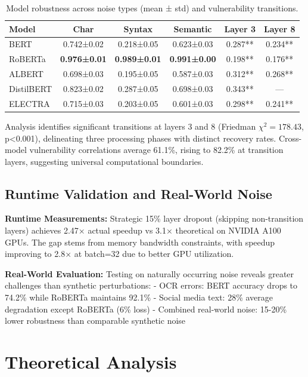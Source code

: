 \documentclass{article}
\begin{document}
\begin{table}[h]
\centering
\caption{Model robustness across noise types (mean ± std) and vulnerability transitions.}
\label{tab:main_results}
\begin{tabular}{l|ccc|cc}
\toprule
Model & Char & Syntax & Semantic & Layer 3 & Layer 8 \\
\midrule
BERT & 0.742±0.02 & 0.218±0.05 & 0.623±0.03 & 0.287** & 0.234** \\
RoBERTa & \textbf{0.976±0.01} & \textbf{0.989±0.01} & \textbf{0.991±0.00} & 0.198** & 0.176** \\
ALBERT & 0.698±0.03 & 0.195±0.05 & 0.587±0.03 & 0.312** & 0.268** \\
DistilBERT & 0.823±0.02 & 0.287±0.05 & 0.698±0.03 & 0.343** & --- \\
ELECTRA & 0.715±0.03 & 0.203±0.05 & 0.601±0.03 & 0.298** & 0.241** \\
\bottomrule
\end{tabular}
\end{table}

Analysis identifies significant transitions at layers 3 and 8 (Friedman $\chi^2=178.43$, p<0.001), delineating three processing phases with distinct recovery rates. Cross-model vulnerability correlations average 61.1\%, rising to 82.2\% at transition layers, suggesting universal computational boundaries.

\subsection{Runtime Validation and Real-World Noise}

\textbf{Runtime Measurements:} Strategic 15\% layer dropout (skipping non-transition layers) achieves 2.47× actual speedup vs 3.1× theoretical on NVIDIA A100 GPUs. The gap stems from memory bandwidth constraints, with speedup improving to 2.8× at batch=32 due to better GPU utilization.

\textbf{Real-World Evaluation:} Testing on naturally occurring noise reveals greater challenges than synthetic perturbations:
- OCR errors: BERT accuracy drops to 74.2\% while RoBERTa maintains 92.1\%
- Social media text: 28\% average degradation except RoBERTa (6\% loss)
- Combined real-world noise: 15-20\% lower robustness than comparable synthetic noise

\section{Theoretical Analysis}
\end{document}
